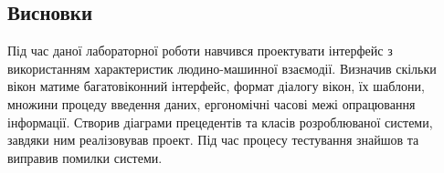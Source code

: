 \documentclass[14pt]{extreport}
\begin{document}
\begin{normalsize}
	\section*{Висновки}
	
	Під час даної лабораторної роботи навчився проектувати інтерфейс з використанням характеристик людино-машинної взаємодії. Визначив скільки вікон матиме багатовіконний інтерфейс, формат діалогу вікон, їх шаблони, множини процеду введення даних, ергономічні часові межі опрацювання інформації. Створив діаграми прецедентів та класів розроблюваної системи, завдяки ним реалізовував проект. Під час процесу тестування знайшов та виправив помилки системи.
	
	    
\end{normalsize}
\end{document}
